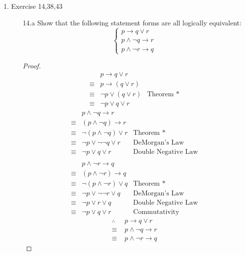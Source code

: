 \documentclass[12pt]{article}
\begin{document}
\begin{enumerate}
    \item Exercise 14,38,43
        \begin{enumerate}
            \item[14.a] Show that the following statement forms are all logically equivalent:
            \[
            \begin{cases}
                p \rightarrow q\vee r\\
                p \wedge \neg q \rightarrow r\\
                p\wedge \neg r \rightarrow q
            \end{cases}
            \]
            \begin{proof}
                \begin{align*}
                    & p \rightarrow q\vee r\\
                    \equiv & p \rightarrow (q\vee r)\\
                    \equiv & \neg p \vee (q \vee r) & \text{Theorem *} \\
                    \equiv & \neg p \vee q \vee r
                \end{align*}
                \begin{align*}
                    & p \wedge \neg q \rightarrow r\\
                    \equiv & (p \wedge \neg q) \rightarrow r\\
                    \equiv & \neg (p \wedge \neg q) \vee r & \text{Theorem *} \\
                    \equiv & \neg p \vee \neg \neg q \vee r & \text{DeMorgan's Law} \\
                    \equiv & \neg p \vee q \vee r & \text{Double Negative Law} \\
                \end{align*}
                \begin{align*}
                    & p\wedge \neg r \rightarrow q\\
                    \equiv & (p\wedge \neg r) \rightarrow q\\
                    \equiv & \neg (p\wedge \neg r) \vee q & \text{Theorem *}\\
                    \equiv & \neg p \vee \neg \neg r \vee q & \text{DeMorgan's Law}\\
                    \equiv & \neg p \vee r \vee q & \text{Double Negative Law}\\
                    \equiv & \neg p \vee q \vee r & \text{Commutativity}
                \end{align*}
                \begin{align*}
                \therefore\;\; & p \rightarrow q\vee r \\
                \equiv & p \wedge \neg q \rightarrow r\\
                \equiv & p\wedge \neg r \rightarrow q
                \end{align*}
            \end{proof}


\end{enumerate}
\end{enumerate}
\end{document}
